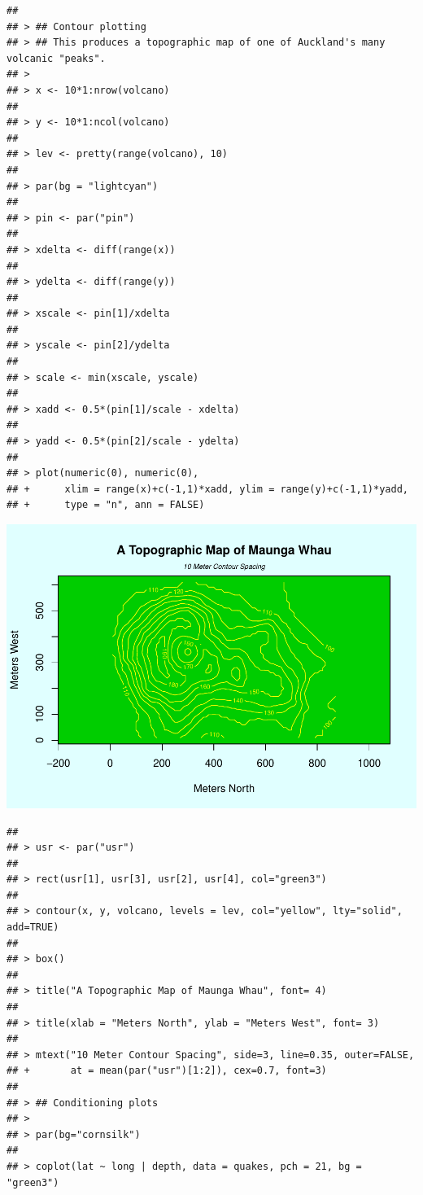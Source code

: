 \documentclass[
]{book}
\begin{document}
\begin{verbatim}
## 
## > ## Contour plotting
## > ## This produces a topographic map of one of Auckland's many volcanic "peaks".
## > 
## > x <- 10*1:nrow(volcano)
## 
## > y <- 10*1:ncol(volcano)
## 
## > lev <- pretty(range(volcano), 10)
## 
## > par(bg = "lightcyan")
## 
## > pin <- par("pin")
## 
## > xdelta <- diff(range(x))
## 
## > ydelta <- diff(range(y))
## 
## > xscale <- pin[1]/xdelta
## 
## > yscale <- pin[2]/ydelta
## 
## > scale <- min(xscale, yscale)
## 
## > xadd <- 0.5*(pin[1]/scale - xdelta)
## 
## > yadd <- 0.5*(pin[2]/scale - ydelta)
## 
## > plot(numeric(0), numeric(0),
## +      xlim = range(x)+c(-1,1)*xadd, ylim = range(y)+c(-1,1)*yadd,
## +      type = "n", ann = FALSE)
\end{verbatim}

\includegraphics{bookdown-demo_files/figure-latex/unnamed-chunk-6-10.pdf}

\begin{verbatim}
## 
## > usr <- par("usr")
## 
## > rect(usr[1], usr[3], usr[2], usr[4], col="green3")
## 
## > contour(x, y, volcano, levels = lev, col="yellow", lty="solid", add=TRUE)
## 
## > box()
## 
## > title("A Topographic Map of Maunga Whau", font= 4)
## 
## > title(xlab = "Meters North", ylab = "Meters West", font= 3)
## 
## > mtext("10 Meter Contour Spacing", side=3, line=0.35, outer=FALSE,
## +       at = mean(par("usr")[1:2]), cex=0.7, font=3)
## 
## > ## Conditioning plots
## > 
## > par(bg="cornsilk")
## 
## > coplot(lat ~ long | depth, data = quakes, pch = 21, bg = "green3")
\end{verbatim}
\end{document}
